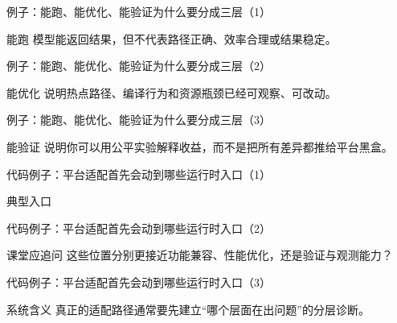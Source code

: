 \begin{frame}{例子：能跑、能优化、能验证为什么要分成三层（1）}
\begin{block}{能跑}
    模型能返回结果，但不代表路径正确、效率合理或结果稳定。
  \end{block}
\end{frame}

\begin{frame}{例子：能跑、能优化、能验证为什么要分成三层（2）}
\begin{block}{能优化}
    说明热点路径、编译行为和资源瓶颈已经可观察、可改动。
  \end{block}
\end{frame}

\begin{frame}{例子：能跑、能优化、能验证为什么要分成三层（3）}
\begin{block}{能验证}
    说明你可以用公平实验解释收益，而不是把所有差异都推给平台黑盒。
  \end{block}
\end{frame}

\begin{frame}{代码例子：平台适配首先会动到哪些运行时入口（1）}
\begin{block}{典型入口}
    {\ttfamily\small
    \par
    \par
    \par
    }
  \end{block}
\end{frame}

\begin{frame}{代码例子：平台适配首先会动到哪些运行时入口（2）}
\begin{block}{课堂应追问}
    这些位置分别更接近功能兼容、性能优化，还是验证与观测能力？
  \end{block}
\end{frame}

\begin{frame}{代码例子：平台适配首先会动到哪些运行时入口（3）}
\begin{block}{系统含义}
    真正的适配路径通常要先建立“哪个层面在出问题”的分层诊断。
  \end{block}
\end{frame}

